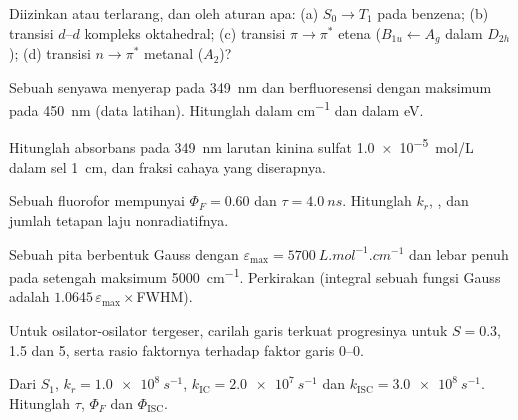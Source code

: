 \begin{exercise}[$\star$]\label{exo:b3:electronic-spectroscopy:1}
Diizinkan atau terlarang, dan oleh aturan apa: (a) $S_0 \to T_1$ pada benzena;
(b) transisi $d$--$d$ kompleks oktahedral; (c) transisi $\pi\to\pi^*$ etena
($B_{1u} \leftarrow A_g$ dalam $D_{2h}$); (d) transisi $n\to\pi^*$ metanal
($A_2$)?
\end{exercise}

\begin{exercise}[$\star$]\label{exo:b3:electronic-spectroscopy:2}
Sebuah senyawa menyerap pada \qty{349}{nm} dan berfluoresensi dengan maksimum
pada \qty{450}{nm} (data latihan). Hitunglah  dalam
\unit{cm^{-1}} dan dalam eV.
\end{exercise}

\begin{exercise}[$\star$]\label{exo:b3:electronic-spectroscopy:3}
Hitunglah absorbans pada \qty{349}{nm} larutan kinina sulfat \qty{1.0e-5}{mol/L}
dalam sel \qty{1}{cm}, dan fraksi cahaya yang diserapnya.
\end{exercise}

\begin{exercise}[$\star$]\label{exo:b3:electronic-spectroscopy:4}
Sebuah fluorofor mempunyai $\Phi_F = 0.60$ dan $\tau = \qty{4.0}{ns}$. Hitunglah
$k_r$, , dan jumlah tetapan laju nonradiatifnya.
\end{exercise}

\begin{exercise}[$\star\star$]\label{exo:b3:electronic-spectroscopy:5}
Sebuah pita berbentuk Gauss dengan $\varepsilon_{\max} = \qty{5700}{L.mol^{-1}.cm^{-1}}$
dan lebar penuh pada setengah maksimum \qty{5000}{cm^{-1}}. Perkirakan  (integral sebuah fungsi Gauss adalah $1.0645\,\varepsilon_{\max}\times$FWHM).
\end{exercise}

\begin{exercise}[$\star\star$]\label{exo:b3:electronic-spectroscopy:6}
Untuk osilator-osilator tergeser, carilah garis terkuat progresinya untuk
$S = 0.3$, 1.5 dan 5, serta rasio faktornya terhadap faktor garis 0--0.
\end{exercise}

\begin{exercise}[$\star\star$]\label{exo:b3:electronic-spectroscopy:7}
Dari $S_1$, $k_r = \qty{1.0e8}{s^{-1}}$, $k_{\mathrm{IC}} = \qty{2.0e7}{s^{-1}}$ dan $k_{\mathrm{ISC}} =
\qty{3.0e8}{s^{-1}}$. Hitunglah $\tau$, $\Phi_F$ dan $\Phi_{\mathrm{ISC}}$.
\end{exercise}

